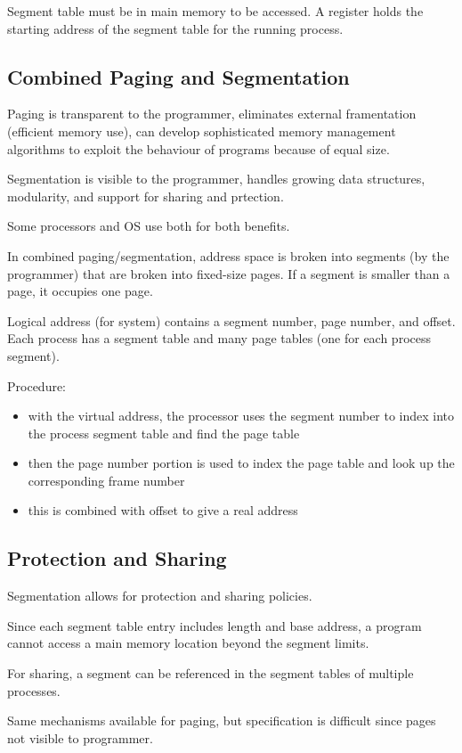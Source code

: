 \documentclass[11pt]{article}
\begin{document}
Segment table must be in main memory to be accessed.
A register holds the starting address of the segment table for the running process.
\subsection{Combined Paging and Segmentation}
\label{sec:org6aa40d0}
Paging is transparent to the programmer, eliminates external framentation (efficient
memory use), can develop sophisticated memory management algorithms to exploit the
behaviour of programs because of equal size.

Segmentation is visible to the programmer, handles growing data structures, modularity,
and support for sharing and prtection.

Some processors and OS use both for both benefits.

In combined paging/segmentation, address space is broken into segments (by the
programmer) that are broken into fixed-size pages.
If a segment is smaller than a page, it occupies one page.

Logical address (for system) contains a segment number, page number, and offset.
Each process has a segment table and many page tables (one for each process segment).

Procedure:
\begin{itemize}
\item with the virtual address, the processor uses the segment number to index into the
process segment table and find the page table
\item then the page number portion is used to index the page table and look up the
corresponding frame number
\item this is combined with offset to give a real address
\end{itemize}
\subsection{Protection and Sharing}
\label{sec:org270958e}
Segmentation allows for protection and sharing policies.

Since each segment table entry includes length and base address, a program cannot
access a main memory location beyond the segment limits.

For sharing, a segment can be referenced in the segment tables of multiple processes.

Same mechanisms available for paging, but specification is difficult since pages not
visible to programmer.
\end{document}
